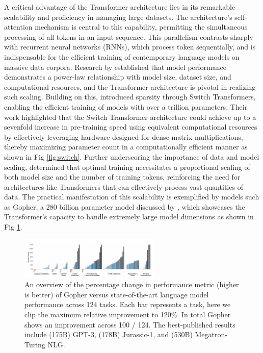 A critical advantage of the Transformer architecture lies in its remarkable scalability and proficiency in managing large datasets. The architecture's self-attention mechanism is central to this capability, permitting the simultaneous processing of all tokens in an input sequence. This parallelism contrasts sharply with recurrent neural networks (RNNs), which process token sequentially, and is indispensable for the efficient training of contemporary language models on massive data corpora. Research by \parencite{kaplan_scaling_2020} established that model performance demonstrates a power-law relationship with model size, dataset size, and computational resources, and the Transformer architecture is pivotal in realizing such scaling. Building on this, \parencite{fedus_switch_2022} introduced sparsity through Switch Transformers, enabling the efficient training of models with over a trillion parameters. Their work highlighted that the Switch Transformer architecture could achieve up to a sevenfold increase in pre-training speed using equivalent computational resources by effectively leveraging hardware designed for dense matrix multiplications, thereby maximizing parameter count in a computationally efficient manner as shown in Fig \ref{fig:switch}. Further underscoring the importance of data and model scaling, \parencite{hoffmann_training_2022} determined that optimal training necessitates a proportional scaling of both model size and the number of training tokens, reinforcing the need for architectures like Transformers that can effectively process vast quantities of data. The practical manifestation of this scalability is exemplified by models such as Gopher, a 280 billion parameter model discussed by \parencite{rae_scaling_2022}, which showcases the Transformer's capacity to handle extremely large model dimensions as shown in Fig \ref{fig:gopher}.

\begin{figure}[htpb]
    \centering
    \includegraphics[width=0.6\textwidth]{../images/image-4.png} %
    \caption{An overview of the percentage change in performance metric (higher is better) of Gopher versus state-of-the-art language model performance across 124 tasks. Each bar represents a task, here we clip the maximum relative improvement to 120\%. In total Gopher shows an improvement across 100 / 124. The best-published results include (175B) GPT-3, (178B) Jurassic-1, and (530B) Megatron-Turing NLG.}
    \label{fig:gopher}
\end{figure}

